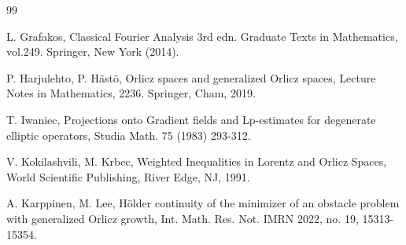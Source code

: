 \documentclass[10pt,a4paper]{article}
\theoremstyle{definition}
\numberwithin{equation}{section}
\begin{document}
\begin{thebibliography}{99}


 L. Grafakos, Classical Fourier Analysis 3rd edn. Graduate Texts in Mathematics, vol.249. Springer, New York (2014).

 P. Harjulehto, P. H{\"a}st{\"o}, Orlicz spaces and generalized Orlicz spaces,  Lecture Notes in Mathematics, 2236. Springer, Cham, 2019.







 T. Iwaniec, Projections onto Gradient fields and Lp-estimates for degenerate elliptic operators, Studia Math. 75 (1983) 293-312.

 V. Kokilashvili,  M. Krbec, Weighted Inequalities in Lorentz and Orlicz Spaces, World Scientific Publishing, River Edge, NJ, 1991.

 A. Karppinen, M. Lee,  H{\"o}lder continuity of the minimizer of an obstacle problem with generalized Orlicz growth, Int. Math. Res. Not. IMRN 2022, no. 19, 15313-15354.



\end{thebibliography}
\end{document}
